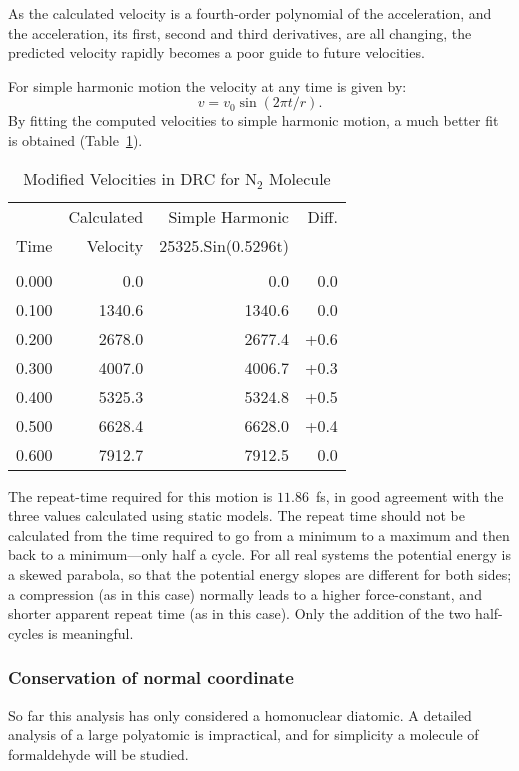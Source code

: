 As the calculated velocity is  a  fourth-order  polynomial  of  the
acceleration,   and  the  acceleration,  its  first,  second  and  third
derivatives, are all changing, the predicted velocity rapidly becomes  a poor
guide to future velocities.

For simple harmonic motion the velocity at any time is given by:
$$ v = v_0 \sin(2\pi t/r). $$
By fitting the computed velocities to simple harmonic motion, a much better fit
is obtained (Table~\ref{tdrc2}).

\begin{table}
\caption{\label{tdrc2} Modified  Velocities in DRC for N$_2$ Molecule}
\begin{center}
\begin{tabular}{rrrr} \hline
 & Calculated & Simple Harmonic  &    Diff. \\
Time  & Velocity  & 25325.Sin(0.5296t) &\\ \hline
            &           &                   &    \\
     0.000  &     0.0   &       0.0         &    0.0  \\
     0.100  &  1340.6   &    1340.6         &    0.0  \\
     0.200  &  2678.0   &    2677.4         &   +0.6  \\
     0.300  &  4007.0   &    4006.7         &   +0.3  \\
     0.400  &  5325.3   &    5324.8         &   +0.5  \\
     0.500  &  6628.4   &    6628.0         &   +0.4  \\
     0.600  &  7912.7   &    7912.5         &    0.0  \\ \hline
\end{tabular}
\end{center}
\end{table}

The repeat-time required for this  motion  is  $11.86$~fs,  in  good agreement
with  the  three  values calculated using static models.  The repeat time
should not be calculated from the time required to go from a minimum  to  a
maximum and then back to a minimum---only half a cycle. For all real systems
the potential energy is a skewed parabola, so  that the  potential energy
slopes are different for both sides; a compression (as in this case) normally
leads to a higher force-constant, and shorter apparent  repeat  time  (as in
this case).  Only the addition of the two half-cycles is meaningful.

\subsubsection{Conservation of normal coordinate}
So far this analysis has only considered a homonuclear diatomic.  A detailed
analysis  of  a  large  polyatomic  is  impractical,  and  for simplicity a
molecule of formaldehyde will be studied.

